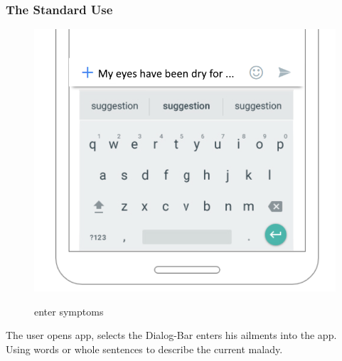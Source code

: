 \subsubsection{The Standard Use}
\begin{minipage}{0.4\textwidth}
\begin{figure}[H]
\centering
\includegraphics[scale=.27]{SystemSpec/Usecases/Mocks/entersym02Normal.png}\\
\caption{\label{fig:blue_rectangle}enter symptoms}
\end{figure}
\end{minipage} \hfill
\begin{minipage}{0.6\textwidth}
The user opens app, selects the Dialog-Bar enters his ailments into the app. Using words or whole sentences to describe the current malady.
\end{minipage}

